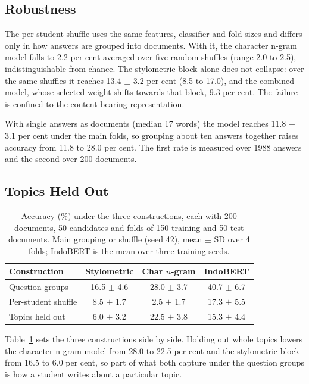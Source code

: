 \documentclass[conference]{IEEEtran}
\begin{document}
\subsection{Robustness}

The per-student shuffle uses the same features, classifier and fold sizes and differs only in how answers are grouped into documents. With it, the character n-gram model falls to 2.2 per cent averaged over five random shuffles (range 2.0 to 2.5), indistinguishable from chance. The stylometric block alone does not collapse: over the same shuffles it reaches 13.4 $\pm$ 3.2 per cent (8.5 to 17.0), and the combined model, whose selected weight shifts towards that block, 9.3 per cent. The failure is confined to the content-bearing representation.

With single answers as documents (median 17 words) the model reaches 11.8 $\pm$ 3.1 per cent under the main folds, so grouping about ten answers together raises accuracy from 11.8 to 28.0 per cent. The first rate is measured over 1988 answers and the second over 200 documents.

\subsection{Topics Held Out}

\begin{table}[!t]
\caption{Accuracy (\%) under the three constructions, each with 200 documents, 50 candidates and folds of 150 training and 50 test documents. Main grouping or shuffle (seed 42), mean $\pm$ SD over 4 folds; IndoBERT is the mean over three training seeds.}
\label{tab:conditions}
\centering
\footnotesize
\setlength{\tabcolsep}{3pt}
\begin{tabular}{@{}lccc@{}}
\hline
Construction & Stylometric & Char $n$-gram & IndoBERT \\
\hline
Question groups      & 16.5 $\pm$ 4.6 & 28.0 $\pm$ 3.7 & 40.7 $\pm$ 6.7 \\
Per-student shuffle  & 8.5 $\pm$ 1.7  & 2.5 $\pm$ 1.7  & 17.3 $\pm$ 5.5 \\
Topics held out      & 6.0 $\pm$ 3.2  & 22.5 $\pm$ 3.8 & 15.3 $\pm$ 4.4 \\
\hline
\end{tabular}
\end{table}

Table~\ref{tab:conditions} sets the three constructions side by side. Holding out whole topics lowers the character n-gram model from 28.0 to 22.5 per cent and the stylometric block from 16.5 to 6.0 per cent, so part of what both capture under the question groups is how a student writes about a particular topic.
\end{document}
